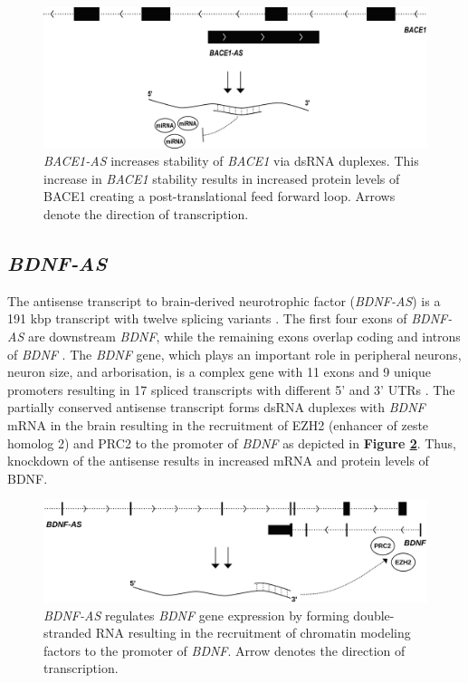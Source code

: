 {%
\begin{figure}%
\centering
\includegraphics[scale=0.45]{figures/BACE1-AS.pdf}
\caption{\emph{BACE1-AS} increases stability of \emph{BACE1} via dsRNA duplexes. This increase in \emph{BACE1} stability results in increased protein levels of BACE1 creating a post-translational feed forward loop. Arrows denote the direction of transcription.}
\label{Figure 1-10: }
\end{figure}

\subsection{\textit{BDNF-AS}}

The antisense transcript to brain-derived neurotrophic factor (\textit{BDNF-AS}) is a 191 kbp transcript with twelve splicing variants \cite{Pruunsild2007}. The first four exons of \textit{BDNF-AS} are downstream \textit{BDNF}, while the remaining exons overlap coding and introns of \textit{BDNF} \cite{Pruunsild2007}. The \textit{BDNF} gene, which plays an important role in peripheral neurons, neuron size, and arborisation, is a complex gene with 11 exons and 9 unique promoters resulting in 17 spliced transcripts with different 5' and 3' UTRs \cite{Modarresi2012,Pruunsild2007}. The partially conserved antisense transcript forms dsRNA duplexes with \textit{BDNF} mRNA in the brain resulting in the recruitment of EZH2 (enhancer of zeste homolog 2) and PRC2 to the promoter of \textit{BDNF} \cite{Modarresi2012} as depicted in \textbf{Figure \ref{Figure 1-11: }}. Thus, knockdown of the antisense results in increased mRNA and protein levels of BDNF.

\begin{figure}[!ht]
\centering
\includegraphics[scale=0.44]{figures/BDNF.pdf}
\caption{\emph{BDNF-AS} regulates \emph{BDNF} gene expression by forming double-stranded RNA resulting in the recruitment of chromatin modeling factors to the promoter of \emph{BDNF}. Arrow denotes the direction of transcription.}
\label{Figure 1-11: }
\end{figure}

}

